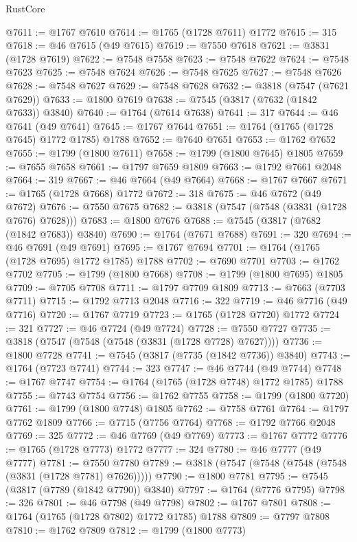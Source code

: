 \begin{lexlean}{RustCore}
\begin{coremodule}
@7611 := @1767 @7610
@7614 := @1765 (@1728 @7611) @1772
@7615 := 315
@7618 := @46 @7615 (@49 @7615)
@7619 := @7550 @7618
@7621 := @3831 (@1728 @7619)
@7622 := @7548 @7558
@7623 := @7548 @7622
@7624 := @7548 @7623
@7625 := @7548 @7624
@7626 := @7548 @7625
@7627 := @7548 @7626
@7628 := @7548 @7627
@7629 := @7548 @7628
@7632 := @3818 (@7547 (@7621 @7629))
@7633 := @1800 @7619
@7638 := @7545 (@3817 (@7632 (@1842 @7633)) @3840)
@7640 := @1764 (@7614 @7638)
@7641 := 317
@7644 := @46 @7641 (@49 @7641)
@7645 := @1767 @7644
@7651 := @1764 (@1765 (@1728 @7645) @1772 @1785) @1788
@7652 := @7640 @7651
@7653 := @1762 @7652
@7655 := @1799 (@1800 @7611)
@7658 := @1799 (@1800 @7645) @1805
@7659 := @7655 @7658
@7661 := @1797 @7659 @1809
@7663 := @1792 @7661 @2048
@7664 := 319
@7667 := @46 @7664 (@49 @7664)
@7668 := @1767 @7667
@7671 := @1765 (@1728 @7668) @1772
@7672 := 318
@7675 := @46 @7672 (@49 @7672)
@7676 := @7550 @7675
@7682 := @3818 (@7547 (@7548 (@3831 (@1728 @7676) @7628)))
@7683 := @1800 @7676
@7688 := @7545 (@3817 (@7682 (@1842 @7683)) @3840)
@7690 := @1764 (@7671 @7688)
@7691 := 320
@7694 := @46 @7691 (@49 @7691)
@7695 := @1767 @7694
@7701 := @1764 (@1765 (@1728 @7695) @1772 @1785) @1788
@7702 := @7690 @7701
@7703 := @1762 @7702
@7705 := @1799 (@1800 @7668)
@7708 := @1799 (@1800 @7695) @1805
@7709 := @7705 @7708
@7711 := @1797 @7709 @1809
@7713 := @7663 (@7703 @7711)
@7715 := @1792 @7713 @2048
@7716 := 322
@7719 := @46 @7716 (@49 @7716)
@7720 := @1767 @7719
@7723 := @1765 (@1728 @7720) @1772
@7724 := 321
@7727 := @46 @7724 (@49 @7724)
@7728 := @7550 @7727
@7735 := @3818 (@7547 (@7548 (@7548 (@3831 (@1728 @7728) @7627))))
@7736 := @1800 @7728
@7741 := @7545 (@3817 (@7735 (@1842 @7736)) @3840)
@7743 := @1764 (@7723 @7741)
@7744 := 323
@7747 := @46 @7744 (@49 @7744)
@7748 := @1767 @7747
@7754 := @1764 (@1765 (@1728 @7748) @1772 @1785) @1788
@7755 := @7743 @7754
@7756 := @1762 @7755
@7758 := @1799 (@1800 @7720)
@7761 := @1799 (@1800 @7748) @1805
@7762 := @7758 @7761
@7764 := @1797 @7762 @1809
@7766 := @7715 (@7756 @7764)
@7768 := @1792 @7766 @2048
@7769 := 325
@7772 := @46 @7769 (@49 @7769)
@7773 := @1767 @7772
@7776 := @1765 (@1728 @7773) @1772
@7777 := 324
@7780 := @46 @7777 (@49 @7777)
@7781 := @7550 @7780
@7789 := @3818 (@7547 (@7548 (@7548 (@7548 (@3831 (@1728 @7781) @7626)))))
@7790 := @1800 @7781
@7795 := @7545 (@3817 (@7789 (@1842 @7790)) @3840)
@7797 := @1764 (@7776 @7795)
@7798 := 326
@7801 := @46 @7798 (@49 @7798)
@7802 := @1767 @7801
@7808 := @1764 (@1765 (@1728 @7802) @1772 @1785) @1788
@7809 := @7797 @7808
@7810 := @1762 @7809
@7812 := @1799 (@1800 @7773)

\end{coremodule}
\end{lexlean}
